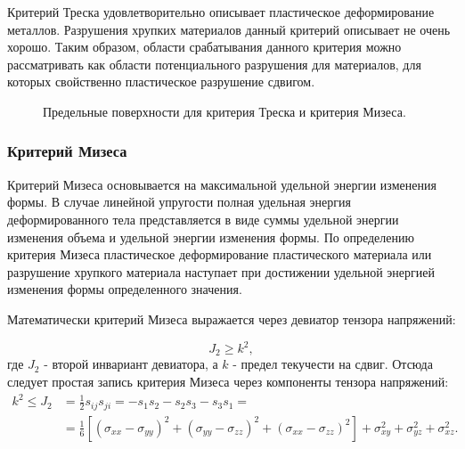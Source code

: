 Критерий Треска удовлетворительно описывает пластическое деформирование металлов. Разрушения хрупких материалов данный критерий описывает не очень хорошо. Таким образом, области срабатывания данного критерия можно рассматривать как области потенциального разрушения для материалов, для которых свойственно пластическое разрушение сдвигом.


\begin{figure}[h]
\caption{Предельные поверхности для критерия Треска и критерия Мизеса.}
\end{figure}


\subsubsection{Критерий Мизеса}

Критерий Мизеса основывается на максимальной удельной энергии изменения формы. В случае линейной упругости полная удельная энергия деформированного тела представляется в виде суммы удельной энергии изменения объема и удельной энергии изменения формы. По определению критерия Мизеса пластическое деформирование пластического материала или разрушение хрупкого материала наступает при достижении удельной энергией изменения формы определенного значения.

Математически критерий Мизеса выражается через девиатор тензора напряжений:

\begin{equation}
\label{von_mises_criteria_generic}
J_2 \ge k^2,
\end{equation}
где $J_2$ - второй инвариант девиатора, а $k$ - предел текучести на сдвиг. Отсюда следует простая запись критерия Мизеса через компоненты тензора напряжений:
\begin{align}
\label{von_mises_criteria_components}
k^2 \le J_2 &= \frac{1}{2}s_{ij}s_{ji} = -s_1s_2 - s_2s_3 - s_3s_1 = \nonumber\\
 &= \frac{1}{6}[(\sigma_{xx} - \sigma_{yy})^2 + (\sigma_{yy} - \sigma_{zz})^2 + (\sigma_{xx} - \sigma_{zz})^2 ] + \sigma_{xy}^2 + \sigma_{yz}^2 + \sigma_{xz}^2.
\end{align}

